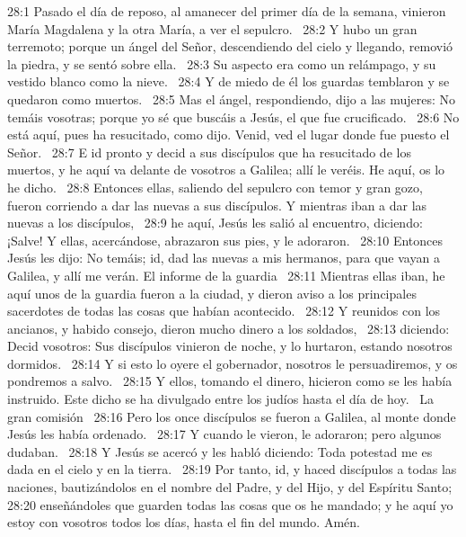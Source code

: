 28:1 Pasado el día de reposo, al amanecer del primer día de la semana, vinieron María Magdalena y la otra María, a ver el sepulcro.  
28:2 Y hubo un gran terremoto; porque un ángel del Señor, descendiendo del cielo y llegando, removió la piedra, y se sentó sobre ella.  
28:3 Su aspecto era como un relámpago, y su vestido blanco como la nieve.  
28:4 Y de miedo de él los guardas temblaron y se quedaron como muertos.  
28:5 Mas el ángel, respondiendo, dijo a las mujeres: No temáis vosotras; porque yo sé que buscáis a Jesús, el que fue crucificado.  
28:6 No está aquí, pues ha resucitado, como dijo. Venid, ved el lugar donde fue puesto el Señor.  
28:7 E id pronto y decid a sus discípulos que ha resucitado de los muertos, y he aquí va delante de vosotros a Galilea; allí le veréis. He aquí, os lo he dicho.  
28:8 Entonces ellas, saliendo del sepulcro con temor y gran gozo, fueron corriendo a dar las nuevas a sus discípulos. Y mientras iban a dar las nuevas a los discípulos,  
28:9 he aquí, Jesús les salió al encuentro, diciendo: ¡Salve! Y ellas, acercándose, abrazaron sus pies, y le adoraron.  
28:10 Entonces Jesús les dijo: No temáis; id, dad las nuevas a mis hermanos, para que vayan a Galilea, y allí me verán. 
El informe de la guardia  
28:11 Mientras ellas iban, he aquí unos de la guardia fueron a la ciudad, y dieron aviso a los principales sacerdotes de todas las cosas que habían acontecido.  
28:12 Y reunidos con los ancianos, y habido consejo, dieron mucho dinero a los soldados,  
28:13 diciendo: Decid vosotros: Sus discípulos vinieron de noche, y lo hurtaron, estando nosotros dormidos.  
28:14 Y si esto lo oyere el gobernador, nosotros le persuadiremos, y os pondremos a salvo.  
28:15 Y ellos, tomando el dinero, hicieron como se les había instruido. Este dicho se ha divulgado entre los judíos hasta el día de hoy.  
La gran comisión   
28:16 Pero los once discípulos se fueron a Galilea, al monte donde Jesús les había ordenado.  
28:17 Y cuando le vieron, le adoraron; pero algunos dudaban.  
28:18 Y Jesús se acercó y les habló diciendo: Toda potestad me es dada en el cielo y en la tierra.  
28:19 Por tanto, id, y haced discípulos a todas las naciones, bautizándolos en el nombre del Padre, y del Hijo, y del Espíritu Santo;  
28:20 enseñándoles que guarden todas las cosas que os he mandado; y he aquí yo estoy con vosotros todos los días, hasta el fin del mundo. Amén.